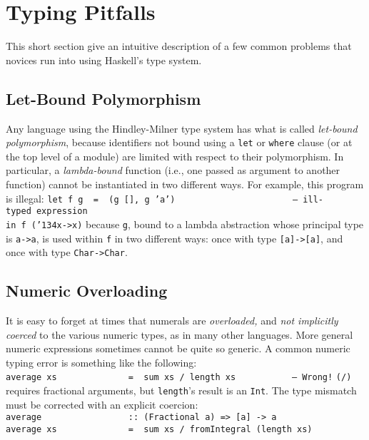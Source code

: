 
\section{Typing Pitfalls}

This short section give an intuitive description of a few common
problems that novices run into using Haskell's type system.

\subsection{Let-Bound Polymorphism}

Any language using the Hindley-Milner type system has what is called
{\em let-bound polymorphism}, because identifiers not bound using a
\mbox{\tt let} or \mbox{\tt where} clause (or at the top level of a module) are limited
with respect to their polymorphism.  In particular, a {\em
lambda-bound} function (i.e., one passed as argument to another
function) cannot be instantiated in two different ways.  For example,
this program is illegal:
\bprog
\mbox{\tt let\ f\ g\ \ =\ \ (g\ [],\ g\ 'a')\ \ \ \ \ \ \ \ \ \ \ \ \ \ \ \ \ \ \ \ \ \ \ --\ ill-typed\ expression}\\
\mbox{\tt in\ f\ ({\char'134}x->x)}
\eprog 
because \mbox{\tt g}, bound to a lambda abstraction whose principal type is
\mbox{\tt a->a}, is used within \mbox{\tt f} in two different ways: once with type
\mbox{\tt [a]->[a]}, and once with type \mbox{\tt Char->Char}.

\subsection{Numeric Overloading}

It is easy to forget at times that numerals are {\em overloaded,} and
{\em not implicitly coerced} to the various numeric types, as in many
other languages.  More general numeric expressions sometimes cannot be
quite so generic.  A common numeric typing error is something like the
following:
\bprog
\mbox{\tt average\ xs\ \ \ \ \ \ \ \ \ \ \ \ \ \ =\ \ sum\ xs\ /\ length\ xs\ \ \ \ \ \ \ \ \ \ \ --\ Wrong!}
\eprog
\mbox{\tt (/)} requires fractional arguments, but \mbox{\tt length}'s result is
an \mbox{\tt Int}.  The type mismatch must be corrected with an explicit coercion:
\bprog
\mbox{\tt average\ \ \ \ \ \ \ \ \ \ \ \ \ \ \ \ \ ::\ (Fractional\ a)\ =>\ [a]\ ->\ a}\\
\mbox{\tt average\ xs\ \ \ \ \ \ \ \ \ \ \ \ \ \ =\ \ sum\ xs\ /\ fromIntegral\ (length\ xs)}
\eprog

